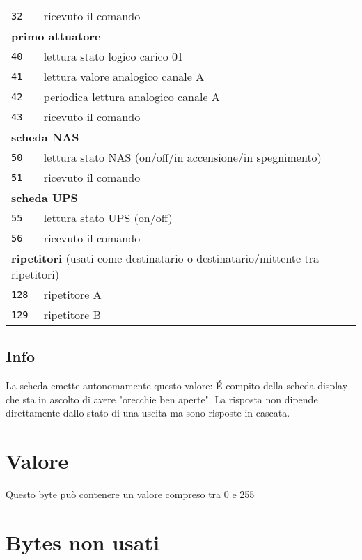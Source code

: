 \documentclass{article}
\begin{document}
\begin{tabular}{ll}
            \texttt{32} & ricevuto il comando\\
            \multicolumn{2}{l}{\textbf{primo attuatore}}\\
		    \texttt{40} & lettura stato logico carico 01\\ 
		    \texttt{41} & lettura valore analogico canale A\\
		    \texttt{42} & periodica lettura analogico canale A\\
			\texttt{43} & ricevuto il comando\\
			\multicolumn{2}{l}{\textbf{scheda NAS}}\\
			\texttt{50} & lettura stato NAS (on/off/in accensione/in spegnimento)\\
			\texttt{51} & ricevuto il comando\\
			\multicolumn{2}{l}{\textbf{scheda UPS}}\\
			\texttt{55} & lettura stato UPS (on/off)\\
			\texttt{56} & ricevuto il comando\\
			\multicolumn{2}{l}{\textbf{ripetitori} (usati come destinatario o destinatario/mittente tra ripetitori)}\\
			\texttt{128} & ripetitore A\\    
			\texttt{129} & ripetitore B\\ 
        \end{tabular}

    \subsection*{Info}
    
    La scheda emette autonomamente questo valore: \'E compito della scheda display che sta in ascolto di avere "orecchie ben aperte". La risposta non dipende direttamente dallo stato di una uscita ma sono risposte in cascata.
    
    \section*{Valore}
    
    Questo byte può contenere un valore compreso tra 0 e 255
    
    \section*{Bytes non usati}
    
\end{document}
